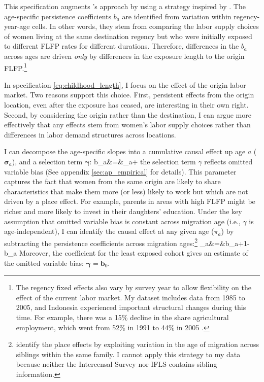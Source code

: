 This specification augments \cite{Fernandez2009}'s approach by using a strategy inspired by \cite{Chetty2018}. The age-specific persistence coefficients $b_a$ are identified from variation within regency-year-age cells. In other words, they stem from comparing the labor supply choices of women living at the same destination regency but who were initially exposed to different FLFP rates for different durations. Therefore, differences in the $b_a$ across ages are driven \textit{only} by differences in the exposure length to the origin FLFP.\footnote{The regency fixed effects also vary by survey year to allow flexibility on the effect of the current labor market. My dataset includes data from 1985 to 2005, and Indonesia experienced important structural changes during this time. For example, there was a 15\% decline in the share agricultural employment, which went from 52\% in 1991 to 44\% in 2005 \citep{WorldBankDI}.}


In specification \eqref{eq:childhood_length}, I focus on the effect of the origin labor market. 
Two reasons support this choice. First, persistent effects from the origin location, even after the exposure has ceased, are interesting in their own right. Second, by considering the origin rather than the destination, I can argue more effectively that any effects stem from women's labor supply choices rather than differences in labor demand structures across locations.

I can decompose the age-specific slopes into a cumulative causal effect up age $a$ ($\boldsymbol{\sigma}_{a}$), and a selection term $\boldsymbol{\gamma}$:
\beqns
\boldsymbol b_a&=&\boldsymbol \sigma_a+\boldsymbol\gamma
\eeqns
the selection term  $\gamma$ reflects omitted variable bias (See appendix \ref{sec:ap_empirical} for details). This parameter captures the fact that women from the same origin are likely to share characteristics that make them more (or less) likely to work but which are not driven by a place effect. For example, parents in areas with high FLFP might be richer and more likely to invest in their daughters' education. Under the key assumption that omitted variable bias is constant across migration age (i.e., $\gamma$ is age-independent), I can identify the causal effect at any given age ($\pi_a$) by subtracting the persistence coefficients across migration ages:\footnote{\cite{Chetty2018} identify the place effects by exploiting variation in the age of migration across siblings within the same family. I cannot apply this strategy to my data because neither the Intercensal Survey nor IFLS contains sibling information.}
\beqns
\boldsymbol\pi_a&=&\boldsymbol b_{a+1}-\boldsymbol b_a
\eeqns
Moreover, the coefficient for the least exposed cohort gives an estimate of the omitted variable bias: $\boldsymbol{\gamma}=\boldsymbol{b}_0$.

